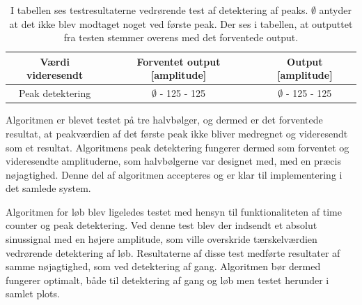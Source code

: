 \begin{table}[H]
	\centering
	\begin{tabular}{ccc}
		\hline
		\rowcolor[HTML]{C0C0C0} 
		Værdi videresendt & Forventet output [amplitude] & Output [amplitude] \\ \hline
		Peak detektering & $\emptyset$ - 125 - 125 & $\emptyset$ - 125 - 125 \\ \hline
	\end{tabular}
	\caption{I tabellen ses testresultaterne vedrørende test af detektering af peaks. $\emptyset$ antyder at det ikke blev modtaget noget ved første peak. Der ses i tabellen, at outputtet fra testen stemmer overens med det forventede output.}
	\label{tab:test_res_peak}
\end{table}\vspace{-0.5cm}
Algoritmen er blevet testet på tre halvbølger, og dermed er det forventede resultat, at peakværdien af det første peak ikke bliver medregnet og videresendt som et resultat. Algoritmens peak detektering fungerer dermed som forventet og videresendte amplituderne, som halvbølgerne var designet med, med en præcis nøjagtighed. Denne del af algoritmen accepteres og er klar til implementering i det samlede system.

Algoritmen for løb blev ligeledes testet med hensyn til funktionaliteten af time counter og peak detektering. Ved denne test blev der indsendt et absolut sinussignal med en højere amplitude, som ville overskride tærskelværdien vedrørende detektering af løb. Resultaterne af disse test medførte resultater af samme nøjagtighed, som ved detektering af gang. Algoritmen bør dermed fungerer optimalt, både til detektering af gang og løb men testet herunder i samlet plots.

